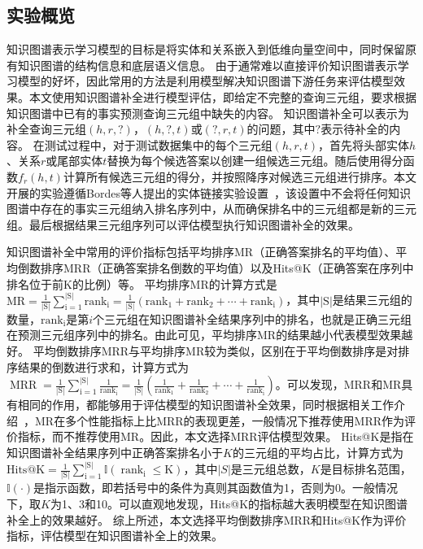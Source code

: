 \documentclass[algorithmlist, AutoFakeBold, AutoFakeSlant, figurelist, tablelist, nomlist, engineering]{seuthesix}
\begin{document}
\subsection{实验概览}
知识图谱表示学习模型的目标是将实体和关系嵌入到低维向量空间中，同时保留原有知识图谱的结构信息和底层语义信息。
由于通常难以直接评价知识图谱表示学习模型的好坏，因此常用的方法是利用模型解决知识图谱下游任务来评估模型效果。本文使用知识图谱补全进行模型评估，即给定不完整的查询三元组，要求根据知识图谱中已有的事实预测查询三元组中缺失的内容。
知识图谱补全可以表示为补全查询三元组$\left(h, r, ?\right)$，$(h, ?, t)$或$\left(?, r, t\right)$的问题，其中$?$表示待补全的内容。
在测试过程中，对于测试数据集中的每个三元组$(h, r, t)$，首先将头部实体$h$、关系$r$或尾部实体$t$替换为每个候选答案以创建一组候选三元组。随后使用得分函数$f_r\left(h, t\right)$计算所有候选三元组的得分，并按照降序对候选三元组进行排序。本文开展的实验遵循Bordes等人提出的实体链接实验设置~\cite{bordes2013translating}，该设置中不会将任何知识图谱中存在的事实三元组纳入排名序列中，从而确保排名中的三元组都是新的三元组。最后根据结果三元组序列可以评估模型执行知识图谱补全的效果。

知识图谱补全中常用的评价指标包括平均排序MR（正确答案排名的平均值）、平均倒数排序MRR（正确答案排名倒数的平均值）以及Hits@K（正确答案在序列中排名位于前K的比例）等。
平均排序MR的计算方式是$\mathrm{MR}=\frac{1}{|\mathrm{S}|} \sum_{\mathrm{i}=1}^{|\mathrm{S}|} \mathrm{rank}_{\mathrm{i}}=\frac{1}{|\mathrm{S}|}\left(\mathrm{rank}_1+\mathrm{rank}_2+\cdots+\mathrm{rank}_{\mathrm{i}}\right)$，其中$|\mathrm{S}|$是结果三元组的数量，$\mathrm{rank}_{\mathrm{i}}$是第$i$个三元组在知识图谱补全结果序列中的排名，也就是正确三元组在预测三元组序列中的排名。由此可见，平均排序MR的结果越小代表模型效果越好。
平均倒数排序MRR与平均排序MR较为类似，区别在于平均倒数排序是对排序结果的倒数进行求和，计算方式为$\operatorname{MRR}=\frac{1}{|\mathrm{S}|} \sum_{\mathrm{i}=1}^{|\mathrm{S}|} \frac{1}{\mathrm{rank}_{\mathrm{i}}}=\frac{1}{|\mathrm{S}|}\left(\frac{1}{\mathrm{rank}_1}+\frac{1}{\mathrm{rank}_2}+\cdots+\frac{1}{\mathrm{rank}_{\mathrm{i}}}\right)$。可以发现，MRR和MR具有相同的作用，都能够用于评估模型的知识图谱补全效果，同时根据相关工作介绍~\cite{hoyt2022unified}，MR在多个性能指标上比MRR的表现更差，一般情况下推荐使用MRR作为评价指标，而不推荐使用MR。因此，本文选择MRR评估模型效果。
Hits@K是指在知识图谱补全结果序列中正确答案排名小于$K$的三元组的平均占比，计算方式为$\mathrm{Hits@K}=\frac{1}{|\mathrm{S}|} \sum_{\mathrm{i}=1}^{|\mathrm{S}|} \mathbb{I}\left(\operatorname{rank}_{\mathrm{i}} \leq \mathrm{K}\right)$，其中$|S|$是三元组总数，$K$是目标排名范围，$\mathbb{I}\left(\cdot\right)$是指示函数，即若括号中的条件为真则其函数值为1，否则为0。一般情况下，取$K$为1、3和10。可以直观地发现，Hits@K的指标越大表明模型在知识图谱补全上的效果越好。
综上所述，本文选择平均倒数排序MRR和Hits@K作为评价指标，评估模型在知识图谱补全上的效果。
\end{document}
